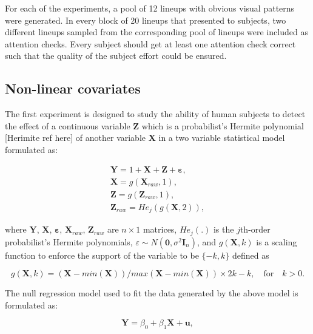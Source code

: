 \documentclass[]{interact}
\theoremstyle{plain}%
\theoremstyle{definition}
\theoremstyle{remark}
\begin{document}
For each of the experiments, a pool of 12 lineups with obvious visual
patterns were generated. In every block of 20 lineups that presented to
subjects, two different lineups sampled from the corresponding pool of
lineups were included as attention checks. Every subject should get at
least one attention check correct such that the quality of the subject
effort could be ensured.

\hypertarget{non-linear-covariates}{%
\subsection{Non-linear covariates}\label{non-linear-covariates}}

The first experiment is designed to study the ability of human subjects
to detect the effect of a continuous variable \(\boldsymbol{Z}\) which
is a probabilist's Hermite polynomial {[}Herimite ref here{]} of another
variable \(\boldsymbol{X}\) in a two variable statistical model
formulated as:

\begin{align} \label{eq:nonlinearity-model}
\boldsymbol{Y} = 1 + \boldsymbol{X} + \boldsymbol{Z} + \boldsymbol{\varepsilon},\\
\boldsymbol{X} = g(\boldsymbol{X}_{raw}, 1), \\
\boldsymbol{Z} = g(\boldsymbol{Z}_{raw}, 1), \\
\boldsymbol{Z}_{raw} = He_j(g(\boldsymbol{X}, 2)),
\end{align}

where \(\boldsymbol{Y}\), \(\boldsymbol{X}\),
\(\boldsymbol{\varepsilon}\), \(\boldsymbol{X}_{raw}\),
\(\boldsymbol{Z}_{raw}\) are \(n\times1\) matrices, \(He_{j}(.)\) is the
\(j\)th-order probabilist's Hermite polynomials,
\(\varepsilon \sim N(\boldsymbol{0}, \sigma^2\boldsymbol{I}_n)\), and
\(g(\boldsymbol{X}, k)\) is a scaling function to enforce the support of
the variable to be \(\{-k, k\}\) defined as

\begin{equation} \label{eq:scaling-function}
g(\boldsymbol{X}, k) = (\boldsymbol{X} - min(\boldsymbol{X}))/max(\boldsymbol{X} - min(\boldsymbol{X})) \times 2k - k, \quad \text{for} \quad k > 0. 
\end{equation}

The null regression model used to fit the data generated by the above
model is formulated as:

\begin{equation} \label{eq:scaling-function}
\boldsymbol{Y} = \beta_0 + \beta_1 \boldsymbol{X} + \boldsymbol{u},
\end{equation}
\end{document}
